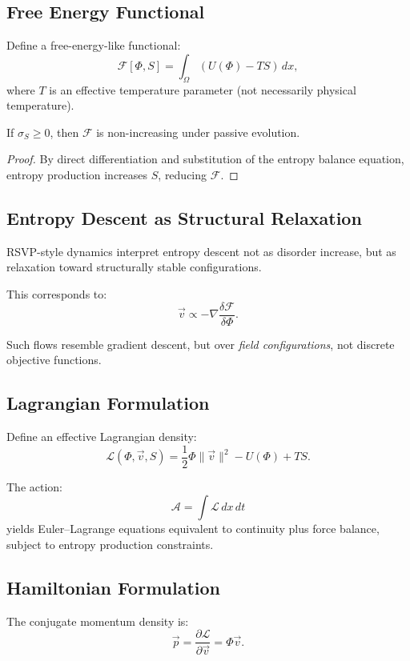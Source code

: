 \subsection{Free Energy Functional}

Define a free-energy-like functional:
\[
\mathcal{F}[\Phi, S] = \int_\Omega \left( U(\Phi) - T S \right) \, dx,
\]
where $T$ is an effective temperature parameter (not necessarily physical temperature).

\begin{lemma}
If $\sigma_S \ge 0$, then $\mathcal{F}$ is non-increasing under passive evolution.
\end{lemma}

\begin{proof}
By direct differentiation and substitution of the entropy balance equation,
entropy production increases $S$, reducing $\mathcal{F}$.
\end{proof}

\subsection{Entropy Descent as Structural Relaxation}

RSVP-style dynamics interpret entropy descent not as disorder increase,
but as relaxation toward structurally stable configurations.

This corresponds to:
\[
\vec{v} \propto - \nabla \frac{\delta \mathcal{F}}{\delta \Phi}.
\]

Such flows resemble gradient descent, but over \emph{field configurations},
not discrete objective functions.

\subsection{Lagrangian Formulation}

Define an effective Lagrangian density:
\[
\mathcal{L}(\Phi, \vec{v}, S) =
\frac{1}{2} \Phi \|\vec{v}\|^2 - U(\Phi) + T S.
\]

The action:
\[
\mathcal{A} = \int \mathcal{L} \, dx \, dt
\]
yields Euler--Lagrange equations equivalent to continuity plus force balance,
subject to entropy production constraints.

\subsection{Hamiltonian Formulation}

The conjugate momentum density is:
\[
\vec{p} = \frac{\partial \mathcal{L}}{\partial \vec{v}} = \Phi \vec{v}.
\]

